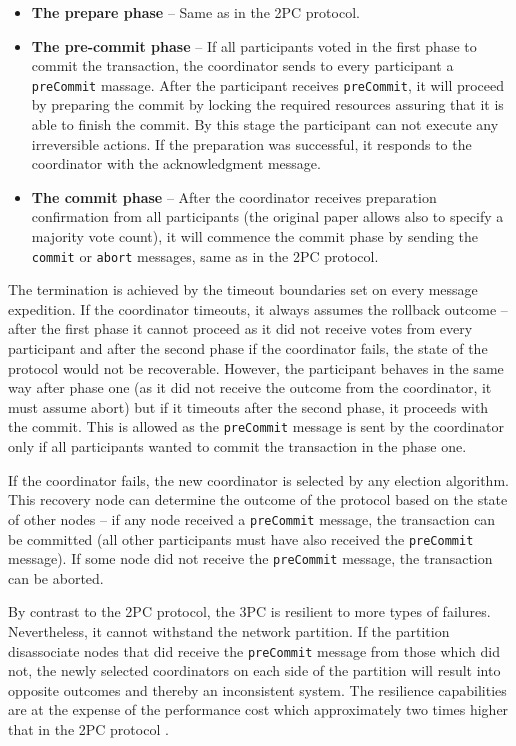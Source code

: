 \documentclass[oneside,
  digital, %
  table,   %
  nolof,     %
  nolot,     %
]{fithesis3}
\begin{document}
\begin{itemize}
    \item \textbf{The prepare phase} -- Same as in the 2PC protocol.
    
    \item \textbf{The pre-commit phase} -- If all participants voted in the first phase to commit the transaction, the coordinator sends to every participant a \texttt{preCommit} massage. After the participant receives \texttt{preCommit}, it will proceed by preparing the commit by locking the required resources assuring that it is able to finish the commit. By this stage the participant can not execute any irreversible actions. If the preparation was successful, it responds to the coordinator with the acknowledgment message.
    
    \item \textbf{The commit phase} -- After the coordinator receives preparation confirmation from all participants (the original paper \cite{3PC} allows also to specify a majority vote count), it will commence the commit phase by sending the \texttt{commit} or \texttt{abort} messages, same as in the 2PC protocol.
\end{itemize}

The termination is achieved by the timeout boundaries set on every message expedition. If the coordinator timeouts, it always assumes the rollback outcome -- after the first phase it cannot proceed as it did not receive votes from every participant and after the second phase if the coordinator fails, the state of the protocol would not be recoverable. However, the participant behaves in the same way after phase one (as it did not receive the outcome from the coordinator, it must assume abort) but if it timeouts after the second phase, it proceeds with the commit. This is allowed as the \texttt{preCommit} message is sent by the coordinator only if all participants wanted to commit the transaction in the phase one.

If the coordinator fails, the new coordinator is selected by any election algorithm. This recovery node can determine the outcome of the protocol based on the state of other nodes -- if any node received a \texttt{preCommit} message, the transaction can be committed (all other participants must have also received the \texttt{preCommit} message). If some node did not receive the \texttt{preCommit} message, the transaction can be aborted.

By contrast to the 2PC protocol, the 3PC is resilient to more types of failures. Nevertheless, it cannot withstand the network partition. If the partition disassociate nodes that did receive the \texttt{preCommit} message from those which did not, the newly selected coordinators on each side of the partition will result into opposite outcomes and thereby an inconsistent system. The resilience capabilities are at the expense of the performance cost which approximately two times higher that in the 2PC protocol \cite{3PC}.
\end{document}
